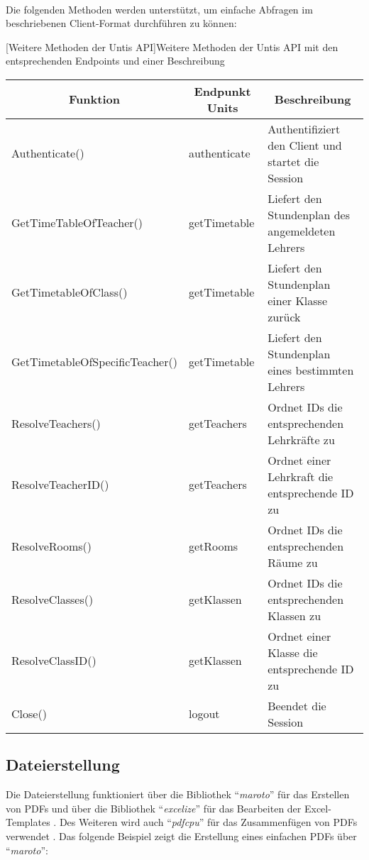 ~\\Die folgenden Methoden werden unterstützt, um einfache Abfragen im beschriebenen Client-Format durchführen zu können:

\newpage

[Weitere Methoden der Untis API]{Weitere Methoden der Untis API mit den entsprechenden Endpoints und einer Beschreibung \cite{untis}}
\begin{table}
	\begin{tabular}{|l|l|l|}
		\hline
		\multicolumn{1}{|c|}{\textbf{Funktion}} & \multicolumn{1}{c|}{\textbf{Endpunkt Units}} & \multicolumn{1}{c|}{\textbf{Beschreibung}} \\ \hline
		Authenticate() & authenticate & Authentifiziert den Client und startet die Session \\ \hline
		GetTimeTableOfTeacher() & getTimetable & Liefert den Stundenplan des angemeldeten Lehrers \\ \hline
		GetTimetableOfClass() & getTimetable & Liefert den Stundenplan einer Klasse zurück \\ \hline
		GetTimetableOfSpecificTeacher() & getTimetable & Liefert den Stundenplan eines bestimmten Lehrers \\ \hline
		ResolveTeachers() & getTeachers & Ordnet IDs die entsprechenden Lehrkräfte zu \\ \hline
		ResolveTeacherID() & getTeachers & Ordnet einer Lehrkraft die entsprechende ID zu \\ \hline
		ResolveRooms() & getRooms & Ordnet IDs die entsprechenden Räume zu \\ \hline
		ResolveClasses() & getKlassen & Ordnet IDs die entsprechenden Klassen zu \\ \hline
		ResolveClassID() & getKlassen & Ordnet einer Klasse die entsprechende ID zu \\ \hline
		Close() & logout & Beendet die Session \\ \hline
	\end{tabular}
\end{table}
\newpage
\subsection{Dateierstellung}


Die Dateierstellung funktioniert über die Bibliothek \enquote{\textit{maroto}} für das Erstellen von PDFs und über die Bibliothek \enquote{\textit{excelize}} für das Bearbeiten der Excel-Templates \cite{marotoart} \cite{maroto} \cite{excelize}. Des Weiteren wird auch \enquote{\textit{pdfcpu}} für das Zusammenfügen von PDFs verwendet \cite{pdfcpu}. Das folgende Beispiel zeigt die Erstellung eines einfachen PDFs über \enquote{\textit{maroto}}:

